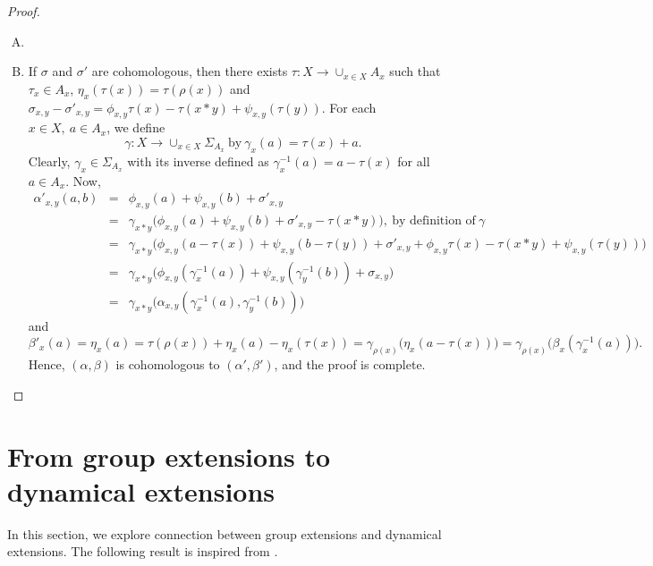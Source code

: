 \documentclass[11pt,reqno]{amsart}
\theoremstyle{definition}
\numberwithin{equation}{subsection}
\begin{document}
\begin{proof}
\begin{enumerate}[(A)]
\item[]
\item If $\sigma$ and $\sigma'$ are cohomologous, then there exists $\tau:X \rightarrow \cup_{x \in X}A_x$ such that $\tau_x \in A_x$, $\eta_x(\tau(x))=\tau(\rho(x))$ and $\sigma_{x,y}-\sigma'_{x,y}=\phi_{x,y} \tau(x)-\tau(x*y)+\psi_{x,y}(\tau(y))$. For each $x \in X, ~a \in A_x$, we define
$$ \gamma:X \rightarrow \cup_{x \in X}\Sigma_{A_x}~\textrm{by}~			\gamma_x(a)=\tau(x)+a.$$
Clearly, $\gamma_x \in \Sigma_{A_x}$ with its inverse defined as $\gamma_x^{-1}(a)=a-\tau(x)$ for all $a \in A_x.$
	Now, \begin{eqnarray*}
	\alpha'_{x,y}(a,b)&=& \phi_{x,y}(a)+\psi_{x,y}(b)+\sigma'_{x,y}\\
	&=&\gamma_{x*y}\big(\phi_{x,y}(a)+\psi_{x,y}(b)+\sigma'_{x,y}-\tau(x*y)\big), ~\textrm{by definition of}~\gamma\\
	&=&\gamma_{x*y}\big(\phi_{x,y}(a-\tau(x))+\psi_{x,y}(b-\tau(y))+\sigma'_{x,y}+\phi_{x,y} \tau(x)-\tau(x*y)+\psi_{x,y}(\tau(y))\big)\\
	&=&\gamma_{x*y}\big(\phi_{x,y}(\gamma_x^{-1}(a))+\psi_{x,y}(\gamma_y^{-1}(b))+\sigma_{x,y}\big)\\
	&=&\gamma_{x*y}\big( \alpha_{x,y}(\gamma_x^{-1}(a), \gamma_y^{-1}(b))\big)
\end{eqnarray*}
and
$$\beta'_x(a)=\eta_x(a)= \tau(\rho(x))+\eta_x(a)-\eta_x(\tau(x))= \gamma_{\rho(x)} \big(\eta_x(a-\tau(x)) \big)= \gamma_{\rho(x)} \big(\beta_x(\gamma_x^{-1}(a)) \big).
$$
Hence, $(\alpha,\beta)$ is cohomologous to $(\alpha',\beta')$, and the proof is complete.
\end{enumerate}
\end{proof}
\medskip



\section{From group extensions to dynamical extensions}\label{sec group extensions and dynamical extensions}
In this section, we explore connection between group extensions and dynamical extensions. The following result is inspired from \cite[Corollary 2.5]{MR1994219}.
\end{document}
